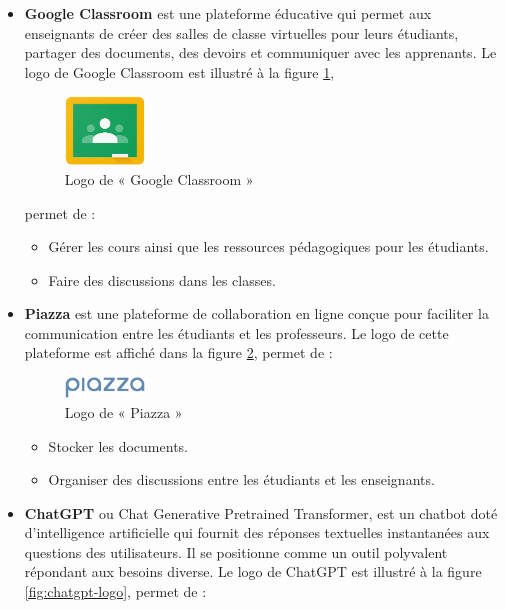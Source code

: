 \begin{itemize}[itemsep=2pt, parsep=2pt]
    \item \textbf{Google Classroom} est une plateforme éducative qui permet aux enseignants de créer des salles de classe virtuelles pour leurs étudiants, partager des documents, des devoirs et communiquer avec les apprenants. Le logo de Google Classroom est illustré à la figure \ref{fig:google-classroom-logo},    
     \begin{figure}[ht]
        \centering
        \includegraphics[width=0.2\textwidth]{images/google-classroom-logo.png}
        \caption{Logo de « Google Classroom »}
        \label{fig:google-classroom-logo}
    \end{figure}
    permet de :
    \begin{itemize}[itemsep=1pt, parsep=1pt]
        \item Gérer les cours ainsi que les ressources pédagogiques pour les étudiants.
        \item Faire des discussions dans les classes.
    \end{itemize}
    \item \textbf{Piazza} est une plateforme de collaboration en ligne conçue pour faciliter la communication entre les étudiants et les professeurs. Le logo de cette plateforme est affiché dans la figure \ref{fig:piazza-logo}, permet de :
    \begin{figure}[ht]
        \centering
        \includegraphics[width=0.2\textwidth]{images/piazza-logo.png}
        \caption{Logo de « Piazza »}
        \label{fig:piazza-logo}
    \end{figure}
    \begin{itemize}[itemsep=1pt, parsep=1pt]
        \item Stocker les documents.
        \item Organiser des discussions entre les étudiants et les enseignants.
    \end{itemize}
    \item \textbf{ChatGPT} ou Chat Generative Pretrained Transformer, est un chatbot doté d'intelligence artificielle qui fournit des réponses textuelles instantanées aux questions des utilisateurs. Il se positionne comme un outil polyvalent répondant aux besoins diverse. Le logo de ChatGPT est illustré à la figure \ref{fig:chatgpt-logo}, permet de :

\end{itemize}
